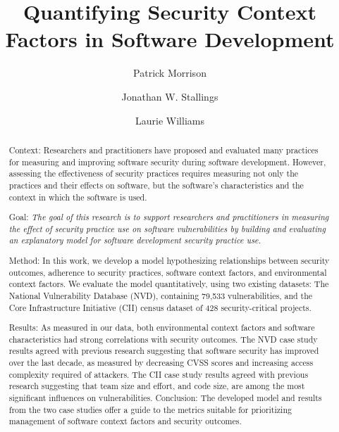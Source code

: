 \documentclass[sigconf]{acmart}
\begin{document}

\title{Quantifying Security Context Factors in Software Development}


\author{Patrick Morrison}

\author{Jonathan W. Stallings}

\author{Laurie Williams}


	
\begin{abstract}
\label{sec:abstract}
Context: Researchers and practitioners have proposed and evaluated many practices for measuring and improving software security during software development. However, assessing the effectiveness of security practices requires measuring not only the practices and their effects on software, but the software's characteristics and the context in which the software is used. 

Goal:  \textit{The goal of this research is to support researchers and practitioners in measuring the effect of security practice use on software vulnerabilities by building and evaluating an explanatory model for software development security practice use.} 

Method: In this work, we develop a model hypothesizing relationships between security outcomes, adherence to security practices, software context factors, and environmental context factors.  We evaluate the model quantitatively, using two existing datasets: The National Vulnerability Database (NVD), containing 79,533 vulnerabilities, and the Core Infrastructure Initiative (CII) census dataset of 428 security-critical projects.  

Results: As measured in our data, both environmental context factors and software characteristics had strong correlations with security outcomes. The NVD case study results agreed with previous research suggesting that software security has improved over the last decade, as measured by decreasing CVSS scores and increasing access complexity required of attackers. The CII case study results agreed with previous research suggesting that team size and effort, and code size, are among the most significant influences on vulnerabilities. 
Conclusion: The developed model and results from the two case studies offer a guide to the metrics suitable for prioritizing management of software context factors and security outcomes. 


\end{abstract}
\end{document}
